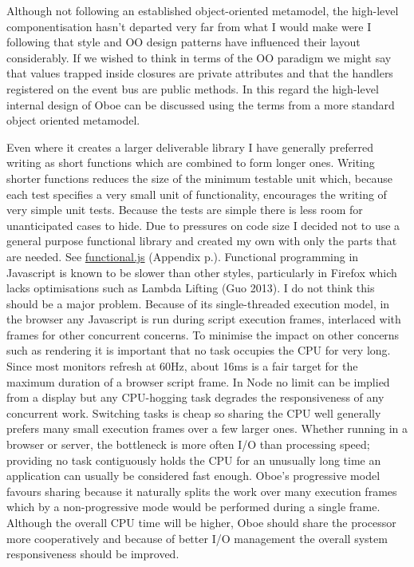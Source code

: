 \documentclass[12pt, ]{article}
\begin{document}
Although not following an established object-oriented metamodel, the
high-level componentisation hasn't departed very far from what I would
make were I following that style and OO design patterns have influenced
their layout considerably. If we wished to think in terms of the OO
paradigm we might say that values trapped inside closures are private
attributes and that the handlers registered on the event bus are public
methods. In this regard the high-level internal design of Oboe can be
discussed using the terms from a more standard object oriented
metamodel.

Even where it creates a larger deliverable library I have generally
preferred writing as short functions which are combined to form longer
ones. Writing shorter functions reduces the size of the minimum testable
unit which, because each test specifies a very small unit of
functionality, encourages the writing of very simple unit tests. Because
the tests are simple there is less room for unanticipated cases to hide.
Due to pressures on code size I decided not to use a general purpose
functional library and created my own with only the parts that are
needed. See \hyperref[headerux5ffunctional]{functional.js} (Appendix
p.\pageref{src_functional}). Functional programming in Javascript is
known to be slower than other styles, particularly in Firefox which
lacks optimisations such as Lambda Lifting (Guo 2013). I do not think
this should be a major problem. Because of its single-threaded execution
model, in the browser any Javascript is run during script execution
frames, interlaced with frames for other concurrent concerns. To
minimise the impact on other concerns such as rendering it is important
that no task occupies the CPU for very long. Since most monitors refresh
at 60Hz, about 16ms is a fair target for the maximum duration of a
browser script frame. In Node no limit can be implied from a display but
any CPU-hogging task degrades the responsiveness of any concurrent work.
Switching tasks is cheap so sharing the CPU well generally prefers many
small execution frames over a few larger ones. Whether running in a
browser or server, the bottleneck is more often I/O than processing
speed; providing no task contiguously holds the CPU for an unusually
long time an application can usually be considered fast enough. Oboe's
progressive model favours sharing because it naturally splits the work
over many execution frames which by a non-progressive mode would be
performed during a single frame. Although the overall CPU time will be
higher, Oboe should share the processor more cooperatively and because
of better I/O management the overall system responsiveness should be
improved.
\end{document}
